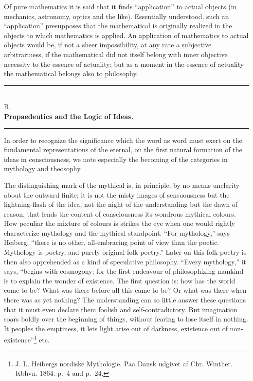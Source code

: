 \documentclass[12pt,a4paper,openany]{book}
\newcommand{\opage}[1]{\marginnote{\footnotesize\textit{[#1]}}}
\begin{document}
Of pure mathematics it is said that it finds ``application'' to actual objects (in mechanics, astronomy, optics and
the like). Essentially understood, such an ``application'' presupposes that the mathematical is originally realized
in the objects to which mathematics is applied. An application of mathematics to actual objects would be, if not a
sheer impossibility, at any rate a subjective arbitrariness, if the mathematical did not itself belong with inner
objective necessity to the essence of actuality; but as a moment in the essence of actuality the mathematical
belongs also to philosophy.

\begin{center}\rule{4em}{0.4pt}\\[0.5em]
B.\\[0.3em]
\textbf{Propaedeutics and the Logic of Ideas.}\\[0.5em]
\rule{4em}{0.4pt}\end{center}

In order to recognize the significance which the word as word must exert on the fundamental representations of the
eternal, on the first natural formation of the ideas in consciousness, we note especially the becoming of the
categories in mythology and theosophy.

The distinguishing mark of the mythical is, in principle, by no means unclarity about the outward finite; it is not
the misty images of sensuousness but the lightning-flash of the idea, not the night of the understanding but the
dawn of reason, that lends the content of consciousness its wondrous mythical colours. How peculiar the mixture of
colours is strikes the eye when one would rightly characterize mythology and the mythical standpoint. ``For
mythology,''
\opage{82}says Heiberg, ``there is no other, all-embracing point of view than the poetic. Mythology is poetry, and
purely original folk-poetry.'' Later on this folk-poetry is then also apprehended as a kind of speculative
philosophy. ``Every mythology,'' it says, ``begins with cosmogony; for the first endeavour of philosophizing mankind
is to explain the wonder of existence. The first question is: how has the world come to be? What was there before
all this came to be? Or what was there when there was as yet nothing? The understanding can so little answer these
questions that it must even declare them foolish and self-contradictory. But imagination soars boldly over the
beginning of things, without fearing to lose itself in nothing. It peoples the emptiness, it lets light arise out of
darkness, existence out of non-existence''\footnote[1]{J. L. Heibergs nordiske Mythologie. Paa Dansk udgivet af
Chr. Winther. Kbhvn. 1864. p.~4 and p.~24.} etc.
\end{document}
